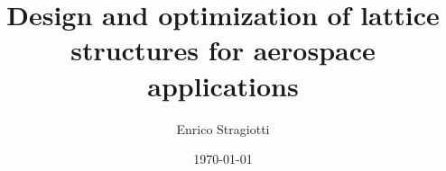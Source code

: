 \documentclass[
	fontsize=11pt, %
	twoside=true, %
	secnumdepth=2, %
	listof=totoc, %
]{kaobook}
\begin{document}

\titlehead{PhD manuscript}
\title[Design and optimization of lattice structures for aerospace applications]{Design and optimization of lattice structures for aerospace applications}
\author[ES]{Enrico Stragiotti}
\date{\today}
\publishers{ONERA -- ISAE Supaero}


\address{1: ONERA - The French Aerospace Lab\\
DMAS - Département matériaux et structures\\
92320 Châtillon, France\\
\{francois-xavier.irisarri, cedric.julien\}@onera.fr\\
\
\\
2: ICA - Institut Clément Ader\\
ISAE - SUPAERO\\
31400 Toulouse, France\\
joseph.morlier@isae-supaero.fr\\
}


\frontmatter %


\makeatletter
\end{document}
